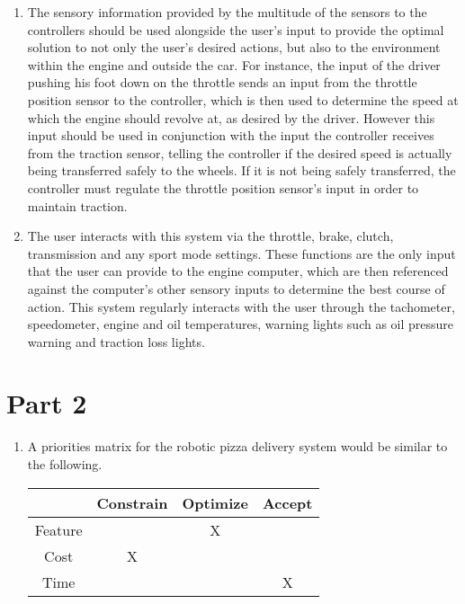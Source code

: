 \documentclass[a4paper]{article}
\begin{document}
\begin{enumerate}[label=(\alph*)]
\item The sensory information provided by the multitude of the sensors to the controllers should be used alongside the user’s input to provide the optimal solution to not only the user’s desired actions, but also to the environment within the engine and outside the car. For instance, the input of the driver pushing his foot down on the throttle sends an input from the throttle position sensor to the controller, which is then used to determine the speed at which the engine should revolve at, as desired by the driver. However this input should be used in conjunction with the input the controller receives from the traction sensor, telling the controller if the desired speed is actually being transferred safely to the wheels. If it is not being safely transferred, the controller must regulate the throttle position sensor’s input in order to maintain traction.

\item The user interacts with this system via the throttle, brake, clutch, transmission and any sport mode settings. These functions are the only input that the user can provide to the engine computer, which are then referenced against the computer’s other sensory inputs to determine the best course of action. This system regularly interacts with the user through the tachometer, speedometer, engine and oil temperatures, warning lights such as oil pressure warning and traction loss lights.

\end{enumerate}

\section{Part 2}
\label{sec2}

\begin{enumerate}[label=(\alph*)]
\item A priorities matrix for the robotic pizza delivery system would be similar to the following.

\begin{center}
	\begin{tabular}{|c|c|c|c|}
	\hline
	& Constrain & Optimize & Accept \\
	\hline
	Feature & & X & \\
	\hline
	Cost & X & & \\
	\hline
	Time & & & X \\
	\hline
	\end{tabular}
\end{center}




\end{enumerate}
\end{document}

